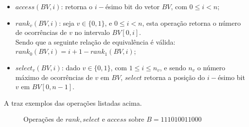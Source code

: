 \begin{itemize}
    \item $access(BV,i)$: retorna o $i-$ésimo bit do vetor $BV$, com $0 \leq i < n$;
    \item $rank_v(BV,i)$: seja $v \in \{0,1\}$, e $0 \leq i < n$, esta operação retorna o número de ocorrências de $v$ no intervalo $BV[0,i]$.\\
    Sendo que a seguinte relação de equivalência é válida: $rank_0(BV,i)=i +1  - rank_1(BV,i)$;
    \item $select_v(BV,i)$: dado $v \in \{0,1\}$, com $1 \leq i \leq n_v$, e sendo $n_v$ o número máximo de ocorrências de $v$ em $BV$,
    $select$ retorna a posição do $i-$ésimo bit $v$ em $BV[0,n-1]$.
\end{itemize}

A  traz exemplos das operações listadas acima.
\begin{figure}[h!]
\centering
  \caption[Operações sobre vetores de bits]{Operações de $rank, select$ e $access$ sobre $B=111010011000$}
  \label{fig:bitvector-operations}
\end{figure}

